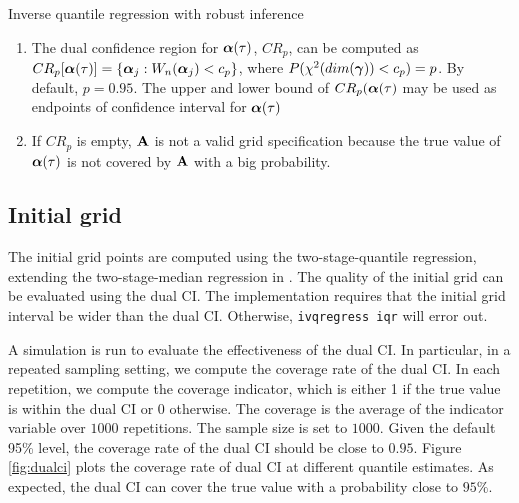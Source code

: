 \begin{algorithm}[H]
\caption{Inverse quantile regression with robust inference}
\label{algo:iqr_robust}

\begin{enumerate}
  

  \item The dual confidence region for $\boldsymbol{\alpha}(\tau)$, $CR_p$, can be computed
    as $CR_p[\boldsymbol{\alpha}(\tau)]  = \{ \boldsymbol{\alpha}_j : W_n(\boldsymbol{\alpha}_j) < c_p \}$, where
    $P(\chi^2(dim(\boldsymbol{\gamma})) < c_p) = p$. By default, $p = 0.95$.  The upper and
    lower bound of $CR_p(\boldsymbol{\alpha}(\tau)$ may be used as endpoints of confidence
    interval for $\boldsymbol{\alpha}(\tau)$

  \item If $CR_p$ is empty, $\mathbf{A}$ is not a valid grid specification because the
    true value of $\boldsymbol{\alpha}(\tau)$ is not covered by $\mathbf{A}$ with a big probability.

\end{enumerate}

\end{algorithm}

\subsection{Initial grid}
The initial grid points are computed using the two-stage-quantile regression,
extending the two-stage-median regression in \cite{Amemiya1982}.
The quality of the initial grid can be evaluated using the dual CI. The
implementation requires that the initial grid interval be wider than the
dual CI. Otherwise, {\tt ivqregress iqr} will error out.

A simulation is run to evaluate the effectiveness of the dual CI. In particular,
in a repeated sampling setting, we compute the coverage rate of the dual CI.  In
each repetition, we compute the coverage indicator, which is either 1 if the
true value is within the dual CI or 0 otherwise. The coverage is the average of
the indicator variable over $1000$ repetitions. The sample size is set to
$1000$.  Given the default 95\% level, the coverage rate of the dual CI should
be close to $0.95$. Figure \ref{fig:dualci} plots the coverage rate of dual CI
at different quantile estimates. As expected, the dual CI can cover the
true value with a probability close to $95\%$.

